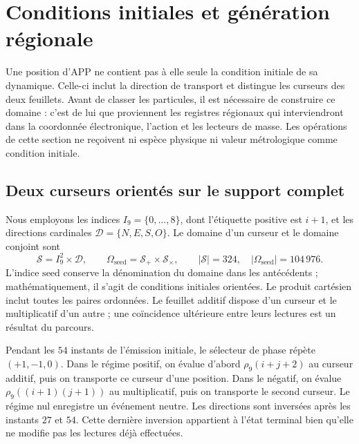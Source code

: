 \section{Conditions initiales et génération régionale}
\label{vi:reg:seccion}\label{sec:extension}\label{sec:generacion}

Une position d’APP ne contient pas à elle seule la condition initiale de sa
dynamique. Celle-ci inclut la direction de transport et distingue les curseurs
des deux feuillets. Avant de classer les particules, il est nécessaire de
construire ce domaine : c’est de lui que proviennent les registres régionaux qui
interviendront dans la coordonnée électronique, l’action et les lecteurs de
masse. Les opérations de cette section ne reçoivent ni espèce physique ni
valeur métrologique comme condition initiale.

\subsection{Deux curseurs orientés sur le support complet}

Nous employons les indices \(I_9=\{0,\ldots,8\}\), dont l’étiquette positive est
\(i+1\), et les directions cardinales \(\mathcal D=\{N,E,S,O\}\).
Le domaine d’un curseur et le domaine conjoint sont
\begin{equation}
 \mathcal S=I_9^2\times\mathcal D,\qquad
 \Omega_{\mathrm{seed}}=\mathcal S_+\times\mathcal S_\times,
 \qquad |\mathcal S|=324,\quad
 |\Omega_{\mathrm{seed}}|=104\,976.
 \label{eq:semillas}
\end{equation}
L’indice \(\mathrm{seed}\) conserve la dénomination du domaine dans
les antécédents ; mathématiquement, il s’agit de conditions initiales
orientées. Le produit cartésien inclut toutes les paires ordonnées.
Le feuillet additif dispose d’un curseur et le multiplicatif d’un autre ; une
coïncidence ultérieure entre leurs lectures est un résultat du parcours.

Pendant les \(54\) instants de l’émission initiale, le sélecteur de phase
répète \((+1,-1,0)\). Dans le régime positif, on évalue d’abord
\(\rho_9(i+j+2)\) au curseur additif, puis on transporte ce
curseur d’une position. Dans le négatif, on évalue
\(\rho_9((i+1)(j+1))\) au multiplicatif, puis on transporte
le second curseur. Le régime nul enregistre un événement neutre. Les
directions sont inversées après les instants \(27\) et \(54\).
Cette dernière inversion appartient à l’état terminal bien qu’elle ne modifie pas
les lectures déjà effectuées.

